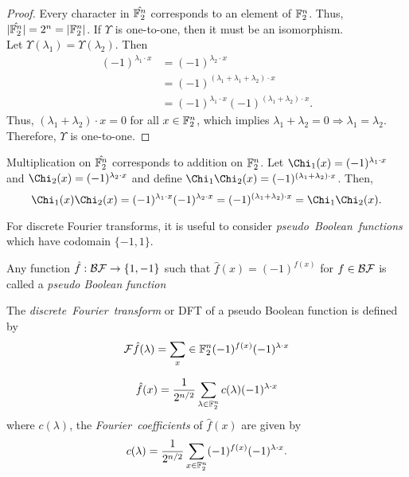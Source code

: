 \begin{proof}
	Every character in $\hat{\mathbb{F}_2^n}$ corresponds to an element of $\mathbb{F}_2^n$. Thus,
	$\lvert\hat{\mathbb{F}_2^n}\rvert=2^n=\lvert\mathbb{F}_2^n\rvert$. If $\Upsilon$ is one-to-one, then
	it must be an isomorphism.\\
	Let $\Upsilon(\lambda_1)=\Upsilon(\lambda_2)$. Then
	\begin{align*}
		(-1)^{\lambda_1\cdot x}&=(-1)^{\lambda_2\cdot x}\\
		                       &=(-1)^{(\lambda_1+\lambda_1+\lambda_2)\cdot x}\\
													 &=(-1)^{\lambda_1\cdot x}(-1)^{(\lambda_1+\lambda_2)\cdot x}.
	\end{align*}
	Thus, $(\lambda_1+\lambda_2)\cdot x=0$ for all $x\in\mathbb{F}_2^n$, which implies
	$\lambda_1+\lambda_2=0\Rightarrow\lambda_1=\lambda_2$. Therefore, $\Upsilon$ is
	one-to-one.
\end{proof}

\par Multiplication on $\hat{\mathbb{F}_2^n}$ corresponds to addition on $\mathbb{F}_2^n$. Let
$\Chi_1(x)=(-1)^{\lambda_1\cdot x}$ and $\Chi_2(x)=(-1)^{\lambda_2\cdot x}$ and define
$\Chi_1\Chi_2(x)=(-1)^{(\lambda_1+\lambda_2)\cdot x}$. Then,
\[
\Chi_1(x)\Chi_2(x)=(-1)^{\lambda_1\cdot x}(-1)^{\lambda_2\cdot x}=(-1)^{(\lambda_1+\lambda_2)\cdot x}=\Chi_1\Chi_2(x).
\]

\par For discrete Fourier transforms, it is useful to consider {\em pseudo\ Boolean\ functions}
which have codomain $\{-1,1\}$. 

\begin{definition}\label{def:pBF}
	Any function $\hat{f}:\mathcal{BF}\rightarrow\{1,-1\}$ such that $\hat{f}(x)=(-1)^{f(x)}$ for $f\in\mathcal{BF}$
	is called a {\em pseudo Boolean function}
\end{definition}

\begin{definition}\label{def:DFT}
	The {\em discrete\ Fourier\ transform} or DFT of a pseudo Boolean function is defined by
	\begin{equation}\label{eqn:DFW}
		\mathcal{F}\hat{f}(\lambda)=\sum_x\in\mathbb{F}_2^n(-1)^{f(x)}(-1)^{\lambda\cdot x}
	\end{equation}
\end{definition}

\begin{lemma}
\begin{equation}\label{eqn:DFT}
	\hat{f}(x)=\frac{1}{2^{n/2}}\sum_{\lambda\in\mathbb{F}_2^n}c(\lambda)(-1)^{\lambda\cdot x}
\end{equation}
	where $c(\lambda)$, the {\em Fourier\ coefficients} of $\hat{f}(x)$ are given by
	\[
  	c(\lambda)=\frac{1}{2^{n/2}}\sum_{x\in\mathbb{F}_2^n}(-1)^{f(x)}(-1)^{\lambda\cdot x}.
	\]
\end{lemma}

